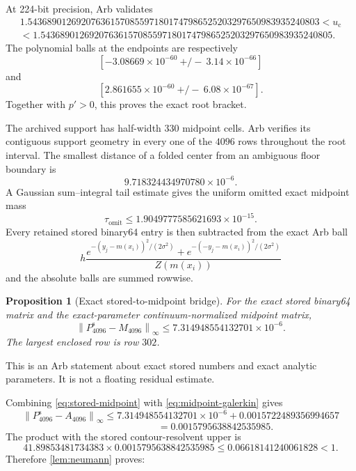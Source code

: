 \documentclass[11pt]{article}
\newtheorem{proposition}[theorem]{Proposition}
\theoremstyle{definition}
\theoremstyle{remark}
\newcommand{\uc}{u_{\mathrm c}}
\newcommand{\norm}[1]{\left\lVert #1\right\rVert}
\begin{document}
At 224-bit precision, Arb \citep{Johansson2017} validates
\begin{align*}
 1.543689012692076361570855971801747986525203297650983935240803
 <\uc\\
 {}<
 1.543689012692076361570855971801747986525203297650983935240805.
\end{align*}
The polynomial balls at the endpoints are respectively
\[
 [-3.08669\times10^{-60}\ \mathord{+/-}\ 3.14\times10^{-66}]
\]
and
\[
 [2.861655\times10^{-60}\ \mathord{+/-}\ 6.08\times10^{-67}].
\]
Together with $p'>0$, this proves the exact root bracket.

The archived support has half-width $330$ midpoint cells.  Arb verifies its
contiguous support geometry in every one of the $4096$ rows throughout the
root interval.  The smallest distance of a folded center from an ambiguous
floor boundary is
\[
 9.718324434970780\times10^{-6}.
\]
A Gaussian sum--integral tail estimate gives the uniform omitted exact
midpoint mass
\[
 \tau_{\mathrm{omit}}
 \le1.9049777585621693\times10^{-15}.
\]
Every retained stored binary64 entry is then subtracted from the exact Arb
ball
\[
 h\frac{
 e^{-(y_j-m(x_i))^2/(2\sigma^2)}
 +e^{-(-y_j-m(x_i))^2/(2\sigma^2)}
 }{Z(m(x_i))}
\]
and the absolute balls are summed rowwise.

\begin{proposition}[Exact stored-to-midpoint bridge]
\label{prop:stored-midpoint}
For the exact stored binary64 matrix and the exact-parameter
continuum-normalized midpoint matrix,
\begin{equation}
 \norm{P^{\mathrm s}_{4096}-M_{4096}}_\infty
 \le7.314948554132701\times10^{-6}.
 \label{eq:stored-midpoint}
\end{equation}
The largest enclosed row is row $302$.
\end{proposition}

This is an Arb statement about exact stored numbers and exact analytic
parameters.  It is not a floating residual estimate.

Combining \cref{eq:stored-midpoint} with
\cref{eq:midpoint-galerkin} gives
\[
 \norm{P^{\mathrm s}_{4096}-A_{4096}}_\infty
 \le
 7.314948554132701\times10^{-6}
 +0.0015722489356994657
\]
\begin{equation}
 \hspace{3cm}
 =0.0015795638842535985.
 \label{eq:stored-galerkin-total}
\end{equation}
The product with the stored contour-resolvent upper is
\[
 41.89853481734383
 \times0.0015795638842535985
 \le0.06618141240061828<1.
\]
Therefore \cref{lem:neumann} proves:
\end{document}

